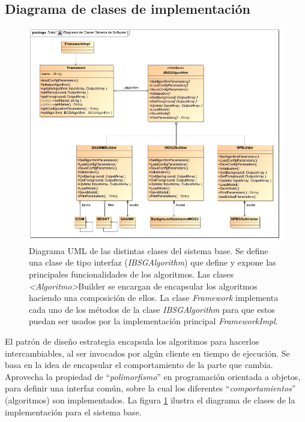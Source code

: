 \subsection{Diagrama de clases de implementación}



\begin{figure}[h!]
\centering
\includegraphics[scale=0.5]{img/ch5/BGSFramework}
\caption[Diagrama UML de clases del sistema base]{Diagrama UML de las distintas clases del sistema base. Se define una clase de tipo interfaz (\textit{IBSGAlgorithm}) que define y expone las principales funcionalidades de los algoritmos. Las clases \textit{<Algoritmo>}Builder se encargan de encapsular los algoritmos haciendo una composición de ellos. La clase \textit{Framework} implementa cada uno de los métodos de la clase \textit{IBSGAlgorithm} para que estos puedan ser usados por la implementación principal \textit{FrameworkImpl}.}
\label{fig:uml_framework}
\end{figure}

El patrón de diseño estrategia encapsula los algoritmos para hacerlos intercambiables, al ser invocados por algún cliente en tiempo de ejecución. Se basa en la idea de encapsular el comportamiento de la parte que cambia. Aprovecha la propiedad de ``\textit{polimorfismo}'' en programación orientada a objetos, para definir una interfaz común, sobre la cual los diferentes ``\textit{comportamientos}'' (algoritmos) son implementados. La figura \ref{fig:uml_framework} ilustra el diagrama de clases de la implementación para el sistema base.

